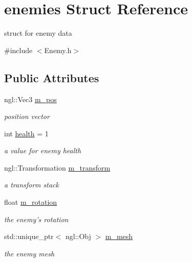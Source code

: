 \hypertarget{structenemies}{\section{enemies Struct Reference}
\label{structenemies}
}


struct for enemy data  




{\ttfamily \#include $<$Enemy.\-h$>$}

\subsection*{Public Attributes}
\begin{DoxyCompactItemize}
\item 
\hypertarget{structenemies_afd54ed444c64332f99b6b2f05748c00a}{ngl\-::\-Vec3 \hyperlink{structenemies_afd54ed444c64332f99b6b2f05748c00a}{m\-\_\-pos}}\label{structenemies_afd54ed444c64332f99b6b2f05748c00a}

\begin{DoxyCompactList}\small\item\em position vector \end{DoxyCompactList}\item 
\hypertarget{structenemies_a1b20a27575599cab0d3296b89e43a11e}{int \hyperlink{structenemies_a1b20a27575599cab0d3296b89e43a11e}{health} = 1}\label{structenemies_a1b20a27575599cab0d3296b89e43a11e}

\begin{DoxyCompactList}\small\item\em a value for enemy health \end{DoxyCompactList}\item 
\hypertarget{structenemies_a53f400db7f025d1aa7ade848adf7a127}{ngl\-::\-Transformation \hyperlink{structenemies_a53f400db7f025d1aa7ade848adf7a127}{m\-\_\-transform}}\label{structenemies_a53f400db7f025d1aa7ade848adf7a127}

\begin{DoxyCompactList}\small\item\em a transform stack \end{DoxyCompactList}\item 
\hypertarget{structenemies_ae8ebc70fc81a14f7706e6ded0a42e657}{float \hyperlink{structenemies_ae8ebc70fc81a14f7706e6ded0a42e657}{m\-\_\-rotation}}\label{structenemies_ae8ebc70fc81a14f7706e6ded0a42e657}

\begin{DoxyCompactList}\small\item\em the enemy's rotation \end{DoxyCompactList}\item 
\hypertarget{structenemies_aec12e728bbf6e02ca4fa7ac54dbab8d1}{std\-::unique\-\_\-ptr$<$ ngl\-::\-Obj $>$ \hyperlink{structenemies_aec12e728bbf6e02ca4fa7ac54dbab8d1}{m\-\_\-mesh}}\label{structenemies_aec12e728bbf6e02ca4fa7ac54dbab8d1}

\begin{DoxyCompactList}\small\item\em the enemy mesh \end{DoxyCompactList}\end{DoxyCompactItemize}


